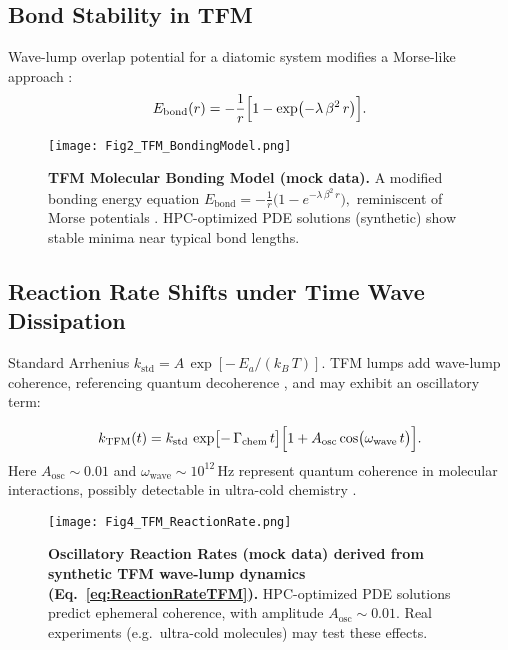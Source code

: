 \documentclass[12pt]{article}
\begin{document}
\subsection{Bond Stability in TFM}
\label{sec:BondStability}
Wave-lump overlap potential for a diatomic system modifies a Morse-like approach \cite{Morse1929PhysRev}:
\begin{equation}
  E_{\mathrm{bond}}(r)
  =
  -\frac{1}{r}
  \Bigl[
    1 - \exp\bigl(-\lambda\,\beta^2\,r\bigr)
  \Bigr].
  \label{eq:BondEq}
\end{equation}
\begin{figure}[ht]
  \centering
  \texttt{[image: Fig2\_TFM\_BondingModel.png]}
  \caption{
    \textbf{TFM Molecular Bonding Model (mock data).} 
    A modified bonding energy equation 
    $E_{\mathrm{bond}}=-\tfrac{1}{r}\bigl(1-e^{-\lambda\,\beta^2\,r}\bigr),$
    reminiscent of Morse potentials \cite{Morse1929PhysRev}.
    HPC-optimized PDE solutions (synthetic) show stable minima near typical bond lengths.
  }
  \label{fig:bondModel}
\end{figure}

\subsection{Reaction Rate Shifts under Time Wave Dissipation}
\label{sec:ReactionShifts}
Standard Arrhenius $k_{\mathrm{std}}= A\,\exp[-\,E_a/(k_B\,T)]$. TFM lumps add wave-lump coherence, referencing quantum decoherence \cite{Zurek2003RMP}, and may exhibit an oscillatory term:

\begin{equation}
  k_{\mathrm{TFM}}(t)
  =
  k_{\mathrm{std}}\,
  \exp\bigl[-\,\Gamma_{\mathrm{chem}}\,t\bigr]
  \Bigl[
    1 + A_{\mathrm{osc}}\cos\bigl(\omega_{\mathrm{wave}}\,t\bigr)
  \Bigr].
  \label{eq:ReactionRateTFM}
\end{equation}
Here $A_{\mathrm{osc}}\sim0.01$ and $\omega_{\mathrm{wave}}\sim 10^{12}$\,Hz represent quantum coherence in molecular interactions, possibly detectable in ultra-cold chemistry \cite{Jin2019Science}.

\begin{figure}[ht]
  \centering
  \texttt{[image: Fig4\_TFM\_ReactionRate.png]}
  \caption{
    \textbf{Oscillatory Reaction Rates (mock data) derived from synthetic TFM wave-lump dynamics (Eq.~\ref{eq:ReactionRateTFM}).}  
    HPC-optimized PDE solutions predict ephemeral coherence, with amplitude $A_{\mathrm{osc}}\sim0.01$. Real experiments (e.g.\ ultra-cold molecules) may test these effects.
  }
  \label{fig:reactionRateShift}
\end{figure}
\end{document}
